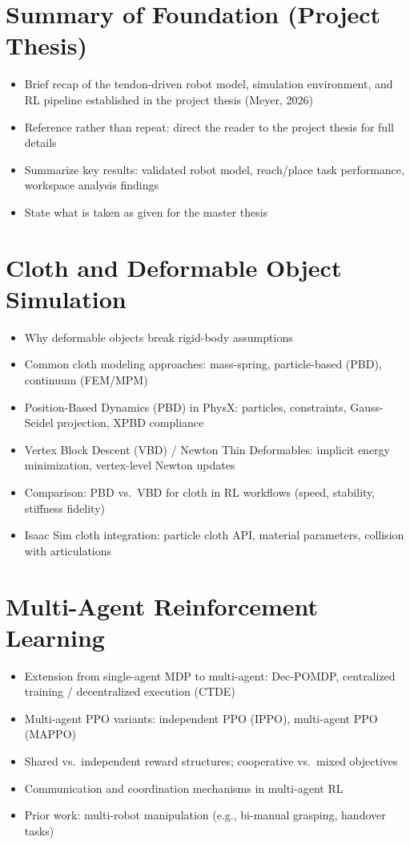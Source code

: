 \section{Summary of Foundation (Project Thesis)}
\begin{itemize}
    \item Brief recap of the tendon-driven robot model, simulation environment, and RL pipeline established in the project thesis (Meyer, 2026)
    \item Reference rather than repeat: direct the reader to the project thesis for full details
    \item Summarize key results: validated robot model, reach/place task performance, workspace analysis findings
    \item State what is taken as given for the master thesis
\end{itemize}

\section{Cloth and Deformable Object Simulation}
\begin{itemize}
    \item Why deformable objects break rigid-body assumptions
    \item Common cloth modeling approaches: mass-spring, particle-based (PBD), continuum (FEM/MPM)
    \item Position-Based Dynamics (PBD) in PhysX: particles, constraints, Gauss-Seidel projection, XPBD compliance
    \item Vertex Block Descent (VBD) / Newton Thin Deformables: implicit energy minimization, vertex-level Newton updates
    \item Comparison: PBD vs.\ VBD for cloth in RL workflows (speed, stability, stiffness fidelity)
    \item Isaac Sim cloth integration: particle cloth API, material parameters, collision with articulations
\end{itemize}

\section{Multi-Agent Reinforcement Learning}
\begin{itemize}
    \item Extension from single-agent MDP to multi-agent: Dec-POMDP, centralized training / decentralized execution (CTDE)
    \item Multi-agent PPO variants: independent PPO (IPPO), multi-agent PPO (MAPPO)
    \item Shared vs.\ independent reward structures; cooperative vs.\ mixed objectives
    \item Communication and coordination mechanisms in multi-agent RL
    \item Prior work: multi-robot manipulation (e.g., bi-manual grasping, handover tasks)
\end{itemize}

